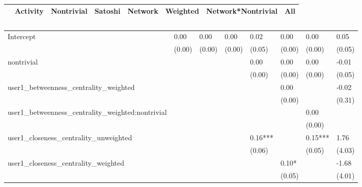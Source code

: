 \begin{table}
\caption{}
\begin{center}
\begin{tabular}{lccccccc}
\hline
                                                 & Activity & Nontrivial & Satoshi & Network & Weighted & Network*Nontrivial &   All     \\
\hline
\hline
\end{tabular}
\begin{tabular}{llllllll}
Intercept                                        & 0.00     & 0.00       & 0.00    & 0.02    & 0.00     & 0.00               & 0.05      \\
                                                 & (0.00)   & (0.00)     & (0.00)  & (0.05)  & (0.00)   & (0.00)             & (0.05)    \\
nontrivial                                       &          &            &         & 0.00    & 0.00     & 0.00               & -0.01     \\
                                                 &          &            &         & (0.00)  & (0.00)   & (0.00)             & (0.05)    \\
user1_betweenness_centrality_weighted            &          &            &         &         & 0.00     &                    & -0.02     \\
                                                 &          &            &         &         & (0.00)   &                    & (0.31)    \\
user1_betweenness_centrality_weighted:nontrivial &          &            &         &         &          & 0.00               &           \\
                                                 &          &            &         &         &          & (0.00)             &           \\
user1_closeness_centrality_unweighted            &          &            &         & 0.16*** &          & 0.15***            & 1.76      \\
                                                 &          &            &         & (0.06)  &          & (0.05)             & (4.03)    \\
user1_closeness_centrality_weighted              &          &            &         &         & 0.10*    &                    & -1.68     \\
                                                 &          &            &         &         & (0.05)   &                    & (4.01)    \\

\end{tabular}
\end{center}
\end{table}
